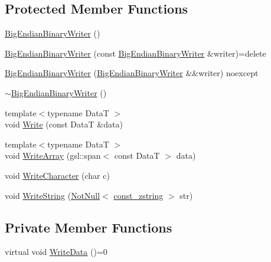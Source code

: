 \subsection*{Protected Member Functions}
\begin{DoxyCompactItemize}
\item 
\mbox{\hyperlink{classmage_1_1_big_endian_binary_writer_ac0917b684913834577d4850269a6c09a}{Big\+Endian\+Binary\+Writer}} ()
\item 
\mbox{\hyperlink{classmage_1_1_big_endian_binary_writer_aafe65752342b2740e7293878ae469d9f}{Big\+Endian\+Binary\+Writer}} (const \mbox{\hyperlink{classmage_1_1_big_endian_binary_writer}{Big\+Endian\+Binary\+Writer}} \&writer)=delete
\item 
\mbox{\hyperlink{classmage_1_1_big_endian_binary_writer_aaf2dcf536afefc7b0ca8b0752024311d}{Big\+Endian\+Binary\+Writer}} (\mbox{\hyperlink{classmage_1_1_big_endian_binary_writer}{Big\+Endian\+Binary\+Writer}} \&\&writer) noexcept
\item 
\mbox{\hyperlink{classmage_1_1_big_endian_binary_writer_ab717bcbfc15ba4a1cb25eeb564e120b8}{$\sim$\+Big\+Endian\+Binary\+Writer}} ()
\item 
{\footnotesize template$<$typename DataT $>$ }\\void \mbox{\hyperlink{classmage_1_1_big_endian_binary_writer_a5df1ef09f8a9a452ffbe9fd3fad1a16a}{Write}} (const DataT \&data)
\item 
{\footnotesize template$<$typename DataT $>$ }\\void \mbox{\hyperlink{classmage_1_1_big_endian_binary_writer_adc489a899f0add4b06ff6b669dc2ebd5}{Write\+Array}} (gsl\+::span$<$ const DataT $>$ data)
\item 
void \mbox{\hyperlink{classmage_1_1_big_endian_binary_writer_a869eff3f6e0666406bd5470af3e02096}{Write\+Character}} (char c)
\item 
void \mbox{\hyperlink{classmage_1_1_big_endian_binary_writer_acf065a2e7462c9e6cf46849bd2c9d2e7}{Write\+String}} (\mbox{\hyperlink{namespacemage_a8769f9d670d6b585ea306cb1062af94b}{Not\+Null}}$<$ \mbox{\hyperlink{namespacemage_abfd9206dc607ceb5d13ec68bf075a5c0}{const\+\_\+zstring}} $>$ str)
\end{DoxyCompactItemize}
\subsection*{Private Member Functions}
\begin{DoxyCompactItemize}
\item 
virtual void \mbox{\hyperlink{classmage_1_1_big_endian_binary_writer_a719581274b1b185ef05687183f7ded25}{Write\+Data}} ()=0
\end{DoxyCompactItemize}
